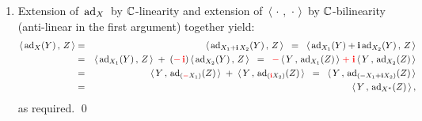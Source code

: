 \begin{enumerate}
\begin{eqnarray*}
    & = &
        \langle\,\ad_{X}(Y_{1})\,,\,Z_{1}\,\rangle
        \,+\,
        \langle\,\ad_{X}(Y_{1})\,,\,\i\,Z_{2}\,\rangle
        \,+\,
        \langle\,\i\,\ad_{X}(Y_{2})\,,\,Z_{1}\,\rangle
        \,+\,
        \langle\,\i\,\ad_{X}(Y_{2})\,,\,\i\,Z_{2}\,\rangle
    \\
    & = &
        \langle\,\ad_{X}(Y_{1})\,,\,Z_{1}\,\rangle
        \,+\,
        \i\,\langle\,\ad_{X}(Y_{1})\,,\,Z_{2}\,\rangle
        \,+\,
        (-\,\i\,)\,\langle\,\ad_{X}(Y_{2})\,,\,Z_{1}\,\rangle
        \,+\,
        (-\,\i)\,\i\,\langle\,\ad_{X}(Y_{2})\,,\,Z_{2}\,\rangle
    \\
    & = &
        -\,\langle\,Y_{1}\,,\,\ad_{X}(Z_{1})\,\rangle
        \,-\,
        \i\,\langle\,Y_{1}\,,\,\ad_{X}(Z_{2})\,\rangle
        \,-\,
        (-\,\i\,)\,\langle\,Y_{2}\,,\,\ad_{X}(Z_{1})\,\rangle
        \,-\,
        (-\,\i)\,\i\,\langle\,Y_{2}\,,\,\ad_{X}(Z_{2})\,\rangle
    \\
    & = &
        -\,\langle\,Y_{1}\,,\,\ad_{X}(Z_{1})\,\rangle
        \,-\,
        \langle\,Y_{1}\,,\,\ad_{X}(\i\,Z_{2})\,\rangle
        \,-\,
        \langle\,\i\,Y_{2}\,,\,\ad_{X}(Z_{1})\,\rangle
        \,-\,
        \langle\,\i\,Y_{2}\,,\,\ad_{X}(\i\,Z_{2})\,\rangle
    \\
    & = &
        -\,\langle\,Y_{1}\,,\,\ad_{X}(Z_{1}+\i\,Z_{2})\,\rangle
        -\,\langle\,\i\,Y_{2}\,,\,\ad_{X}(Z_{1}+\i\,Z_{2})\,\rangle
    \\
    & = &
        -\,\langle\,Y_{1}+\i\,Y_{2}\,,\,\ad_{X}(Z_{1}+\i\,Z_{2})\,\rangle
    \\
    & = &
        -\,\langle\,Y\,,\,\ad_{X}(Z)\,\rangle\,,
    \quad
    \textnormal{as desired}
    \end{eqnarray*}
\item
    Extension of \,$\textnormal{ad}_{X}$\, by {\color{red}$\mathbb{C}$-linearity} and
    extension of
    \,$\langle\,\cdot\,,\,\cdot\,\rangle$\, by {\color{red}$\mathbb{C}$-bilinearity}
    (anti-linear in the first argument)
    together yield:
    \begin{eqnarray*}
    \langle\,\textnormal{ad}_{X}(Y)\,,\,Z\,\rangle
    & = &
        \langle\,\textnormal{ad}_{X_{1} + \mathbf{i}\,X_{2}}(Y)\,,\,Z\,\rangle
    \;\; = \;\;
        \langle\,\textnormal{ad}_{X_{1}}(Y) + \mathbf{i}\,\textnormal{ad}_{X_{2}}(Y)\,,\,Z\,\rangle
    \\
    & = &
        \langle\,\textnormal{ad}_{X_{1}}(Y)\,,\,Z\,\rangle
        \; + \;
        ({\color{red}-\,\mathbf{i}})\,\langle\,\textnormal{ad}_{X_{2}}(Y)\,,\,Z\,\rangle
    \;\; = \;\;
        {\color{red}-}\,\langle\,Y\,,\,\textnormal{ad}_{X_{1}}(Z)\,\rangle
        \; {\color{red}+} \;
        {\color{red}\mathbf{i}}\,\langle\,Y\,,\,\textnormal{ad}_{X_{2}}(Z)\,\rangle
    \\
    & = &
        \langle\,Y\,,\,\textnormal{ad}_{({\color{red}-}X_{1})}(Z)\,\rangle
        \; + \;
        \langle\,Y\,,\,\textnormal{ad}_{({\color{red}\mathbf{i}}X_{2})}(Z)\,\rangle
    \;\; = \;\;
        \langle\,Y\,,\,\textnormal{ad}_{(-X_{1}+\mathbf{i} X_{2})}(Z)\,\rangle
    \\
    & = &
        \langle\,Y\,,\,\textnormal{ad}_{X^{*}}(Z)\,\rangle\,,
    \end{eqnarray*}
    as required.
    \qed
\end{enumerate}

